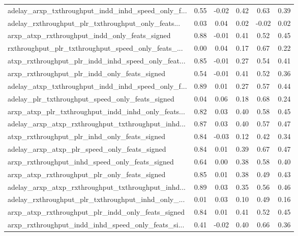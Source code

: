 \begin{tabular}{|l|*{4}{c}|r|}
adelay\_arxp\_txthroughput\_indd\_inhd\_speed\_only\_f... & 0.55 & -0.02 &    0.42 &       0.63 &  0.39 \\
adelay\_rxthroughput\_plr\_txthroughput\_only\_feats... & 0.03 &  0.04 &    0.02 &      -0.02 &  0.02 \\
arxp\_atxp\_rxthroughput\_indd\_only\_feats\_signed      & 0.88 & -0.01 &    0.41 &       0.52 &  0.45 \\
rxthroughput\_plr\_txthroughput\_speed\_only\_feats\_... & 0.00 &  0.04 &    0.17 &       0.67 &  0.22 \\
atxp\_rxthroughput\_plr\_indd\_inhd\_speed\_only\_feat... & 0.85 & -0.01 &    0.27 &       0.54 &  0.41 \\
arxp\_rxthroughput\_plr\_indd\_only\_feats\_signed       & 0.54 & -0.01 &    0.41 &       0.52 &  0.36 \\
adelay\_atxp\_txthroughput\_indd\_inhd\_speed\_only\_f... & 0.89 &  0.01 &    0.27 &       0.57 &  0.44 \\
adelay\_plr\_txthroughput\_speed\_only\_feats\_signed    & 0.04 &  0.06 &    0.18 &       0.68 &  0.24 \\
arxp\_atxp\_plr\_txthroughput\_indd\_inhd\_only\_feats... & 0.82 &  0.03 &    0.40 &       0.58 &  0.45 \\
adelay\_arxp\_atxp\_rxthroughput\_txthroughput\_inhd... & 0.87 &  0.03 &    0.40 &       0.57 &  0.47 \\
atxp\_rxthroughput\_plr\_inhd\_only\_feats\_signed       & 0.84 & -0.03 &    0.12 &       0.42 &  0.34 \\
adelay\_arxp\_atxp\_plr\_speed\_only\_feats\_signed       & 0.84 &  0.01 &    0.39 &       0.67 &  0.47 \\
arxp\_rxthroughput\_inhd\_speed\_only\_feats\_signed     & 0.64 &  0.00 &    0.38 &       0.58 &  0.40 \\
arxp\_atxp\_rxthroughput\_plr\_only\_feats\_signed       & 0.85 &  0.01 &    0.38 &       0.49 &  0.43 \\
adelay\_arxp\_atxp\_rxthroughput\_txthroughput\_inhd... & 0.89 &  0.03 &    0.35 &       0.56 &  0.46 \\
adelay\_rxthroughput\_plr\_txthroughput\_inhd\_only\_... & 0.01 &  0.03 &    0.10 &       0.49 &  0.16 \\
arxp\_atxp\_rxthroughput\_plr\_indd\_only\_feats\_signed  & 0.84 &  0.01 &    0.41 &       0.52 &  0.45 \\
arxp\_rxthroughput\_indd\_inhd\_speed\_only\_feats\_si... & 0.41 & -0.02 &    0.40 &       0.66 &  0.36 \\

\end{tabular}

